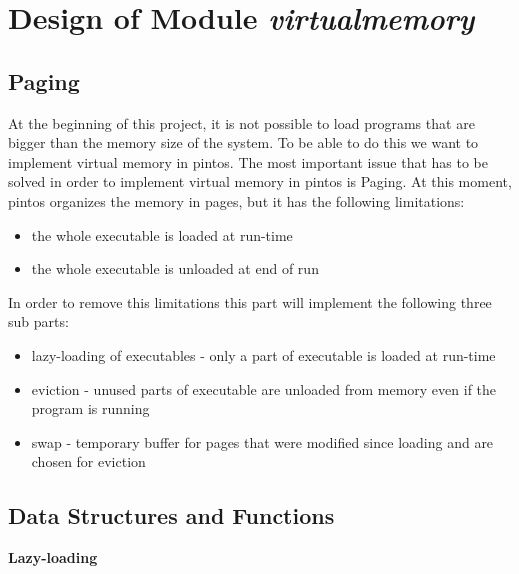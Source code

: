 \chapter{Design of Module \textit{virtualmemory}}


\section{Paging}

At the beginning of this project, it is not possible to load programs that are bigger than the memory size of the system. To be able to do this we want to implement virtual memory in pintos. The most important issue that has to be solved in order to implement virtual memory in pintos is Paging. At this moment, pintos organizes the memory in pages, but it has the following limitations:
\begin{itemize}
 \item the whole executable is loaded at run-time 
 \item the whole executable is unloaded at end of run
\end{itemize}

In order to remove this limitations this part will implement the following three sub parts:
\begin{itemize}
  \item lazy-loading of executables - only a part of executable is loaded at run-time
  \item	eviction - unused parts of executable are unloaded from memory even if the program is running
  \item swap - temporary buffer for pages that were modified since loading and are chosen for eviction
\end{itemize}

\section{Data Structures and Functions}

\textbf{Lazy-loading}

